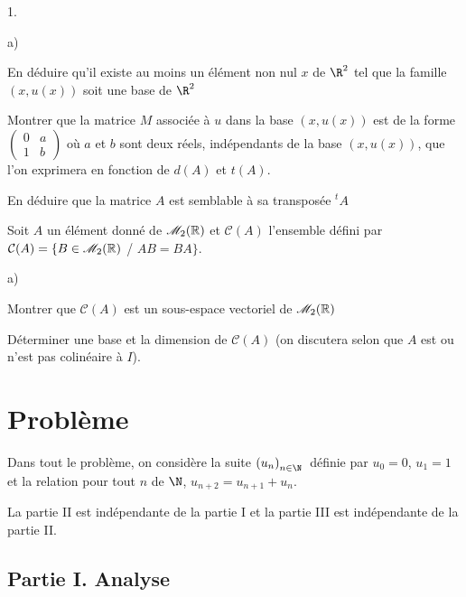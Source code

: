 \documentclass[11pt]{article}%
\begin{document}
\begin{noliste}{1.}
\begin{noliste}{a)}
\item En déduire qu'il existe au moins un élément non nul $x$ de 
$\R^{2}$ tel que la famille $\left( x,u\left( x\right) \right) $
soit une base de $\R^{2}$

\item Montrer que la matrice $M$ associée à $u$ dans la base $\left(
x,u\left( x\right) \right) $ est de la forme $\left( 
\begin{array}{cc}
0 & a \\
1 & b
\end{array}
\right) $ où $a$ et $b$ sont deux réels, indépendants de la base 
$(x,u(x))$, que l'on exprimera en fonction de $d(A)$ et $t(A)$.

\item En déduire que la matrice $A$ est semblable à sa transposée
$^{t}A$
\end{noliste}

\item Soit $A$ un élément donné de $\mathscr{M}_{2}(\mathbb{R}) $ et $\mathcal{C}(A)$
l'ensemble défini par $\mathcal{C}(A) = \{B\in \mathscr{M}_{2}(\mathbb{R}) $ / $AB = BA\}$.

\begin{noliste}{a)}
 \setlength{\itemsep}{2mm}
\item Montrer que $\mathcal{C}(A)$ est un sous-espace vectoriel de
$\mathscr{M}_{2}(\mathbb{R}) $

\item Déterminer une base et la dimension de $\mathcal{C}(A)$ (on
discutera selon que $A$ est ou n'est pas colinéaire à $I$).
\end{noliste}
\end{noliste}

\section*{Problème}

Dans tout le problème, on considère la suite $\left( u_{n}\right)
_{n\in \N}$\ définie par $u_{0} = 0$, $u_{1} = 1$ et la relation pour
tout $n$ de $\N$, $u_{n + 2} = u_{n + 1} + u_{n}$.

La partie II est indépendante de la partie I et la partie III est
indépendante de la partie II.

\subsection*{Partie I. Analyse}
\end{document}
